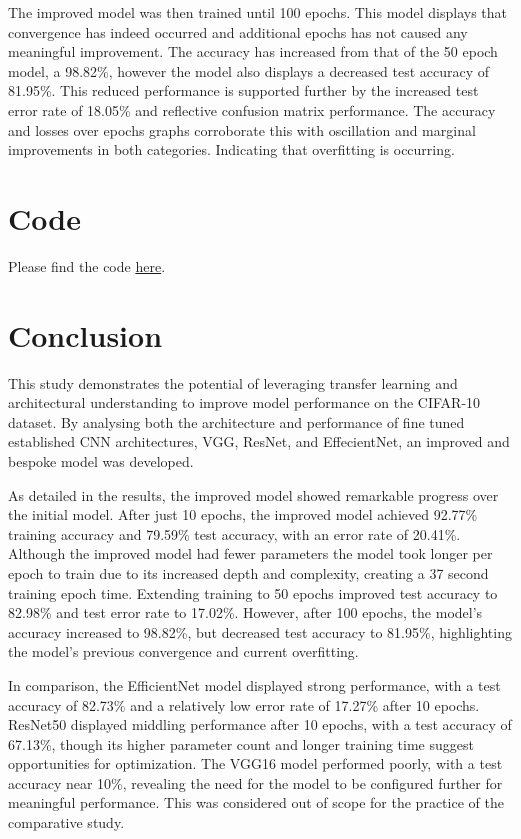 \documentclass[10pt,twocolumn,letterpaper]{article}
\begin{document}
The improved model was then trained until 100 epochs. This model displays that convergence has indeed occurred and additional epochs has not caused any meaningful improvement. The accuracy has increased from that of the 50 epoch model, a 98.82\%, however the model also displays a decreased test accuracy of 81.95\%. This reduced performance is supported further by the increased test error rate of 18.05\% and reflective confusion matrix performance. The accuracy and losses over epochs graphs corroborate this with oscillation and marginal improvements in both categories. Indicating that overfitting is occurring.

\section{Code}
\label{sec:code}
Please find the code \href{https://github.com/Drackonack/DLF_Assignment_02}{here}.

\section{Conclusion}
\label{sec:conclusion}
This study demonstrates the potential of leveraging transfer learning and architectural understanding to improve model performance on the CIFAR-10 dataset. By analysing both the architecture and performance of fine tuned established CNN architectures, VGG, ResNet, and EffecientNet, an improved and bespoke model was developed. 

As detailed in the results, the improved model showed remarkable progress over the initial model. After just 10 epochs, the improved model achieved 92.77\% training accuracy and 79.59\% test accuracy, with an error rate of 20.41\%. Although the improved model had fewer parameters the model took longer per epoch to train due to its increased depth and complexity, creating a 37 second training epoch time. Extending training to 50 epochs improved test accuracy to 82.98\% and test error rate to 17.02\%. However, after 100 epochs, the model’s accuracy increased to 98.82\%, but decreased test accuracy to 81.95\%, highlighting the model's previous convergence and current overfitting.

In comparison, the EfficientNet model displayed strong performance, with a test accuracy of 82.73\% and a relatively low error rate of 17.27\% after 10 epochs. ResNet50 displayed middling performance after 10 epochs, with a test accuracy of 67.13\%, though its higher parameter count and longer training time suggest opportunities for optimization. The VGG16 model performed poorly, with a test accuracy near 10\%, revealing the need for the model to be configured further for meaningful performance. This was considered out of scope for the practice of the comparative study.
\end{document}
